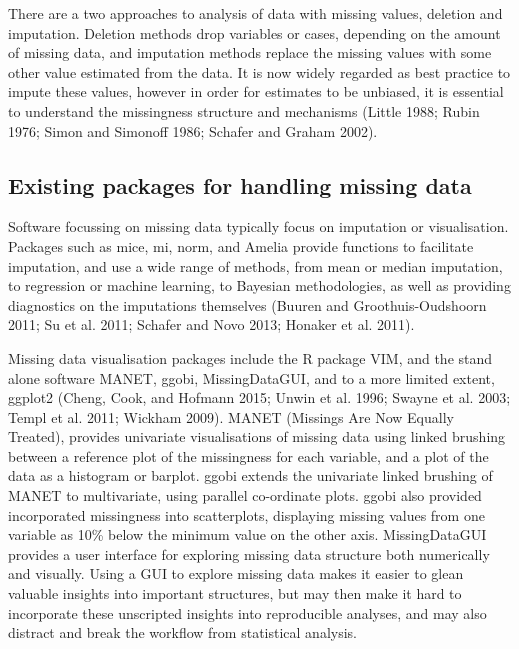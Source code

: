 \documentclass[]{article}
\begin{document}
There are a two approaches to analysis of data with missing values,
deletion and imputation. Deletion methods drop variables or cases,
depending on the amount of missing data, and imputation methods replace
the missing values with some other value estimated from the data. It is
now widely regarded as best practice to impute these values, however in
order for estimates to be unbiased, it is essential to understand the
missingness structure and mechanisms (Little 1988; Rubin 1976; Simon and
Simonoff 1986; Schafer and Graham 2002).

\subsection{Existing packages for handling missing
data}\label{existing-packages-for-handling-missing-data}

Software focussing on missing data typically focus on imputation or
visualisation. Packages such as mice, mi, norm, and Amelia provide
functions to facilitate imputation, and use a wide range of methods,
from mean or median imputation, to regression or machine learning, to
Bayesian methodologies, as well as providing diagnostics on the
imputations themselves (Buuren and Groothuis-Oudshoorn 2011; Su et al.
2011; Schafer and Novo 2013; Honaker et al. 2011).

Missing data visualisation packages include the R package VIM, and the
stand alone software MANET, ggobi, MissingDataGUI, and to a more limited
extent, ggplot2 (Cheng, Cook, and Hofmann 2015; Unwin et al. 1996;
Swayne et al. 2003; Templ et al. 2011; Wickham 2009). MANET (Missings
Are Now Equally Treated), provides univariate visualisations of missing
data using linked brushing between a reference plot of the missingness
for each variable, and a plot of the data as a histogram or barplot.
ggobi extends the univariate linked brushing of MANET to multivariate,
using parallel co-ordinate plots. ggobi also provided incorporated
missingness into scatterplots, displaying missing values from one
variable as 10\% below the minimum value on the other axis.
MissingDataGUI provides a user interface for exploring missing data
structure both numerically and visually. Using a GUI to explore missing
data makes it easier to glean valuable insights into important
structures, but may then make it hard to incorporate these unscripted
insights into reproducible analyses, and may also distract and break the
workflow from statistical analysis.
\end{document}
